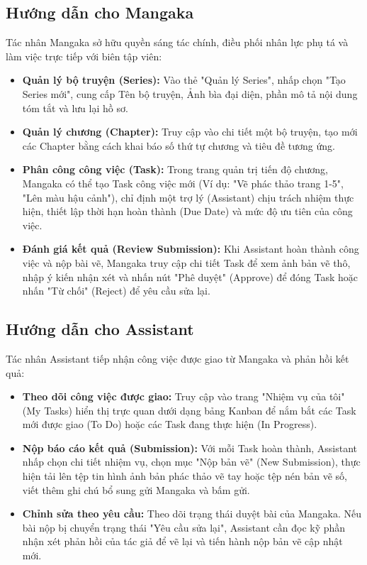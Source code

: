 \subsection{Hướng dẫn cho Mangaka}
\label{subsec:manual_mangaka}
Tác nhân Mangaka sở hữu quyền sáng tác chính, điều phối nhân lực phụ tá và làm việc trực tiếp với biên tập viên:
\begin{itemize}
    \item \textbf{Quản lý bộ truyện (Series):} Vào thẻ "Quản lý Series", nhấp chọn "Tạo Series mới", cung cấp Tên bộ truyện, Ảnh bìa đại diện, phần mô tả nội dung tóm tắt và lưu lại hồ sơ.
    \item \textbf{Quản lý chương (Chapter):} Truy cập vào chi tiết một bộ truyện, tạo mới các Chapter bằng cách khai báo số thứ tự chương và tiêu đề tương ứng.
    \item \textbf{Phân công công việc (Task):} Trong trang quản trị tiến độ chương, Mangaka có thể tạo Task công việc mới (Ví dụ: "Vẽ phác thảo trang 1-5", "Lên màu hậu cảnh"), chỉ định một trợ lý (Assistant) chịu trách nhiệm thực hiện, thiết lập thời hạn hoàn thành (Due Date) và mức độ ưu tiên của công việc.
    \item \textbf{Đánh giá kết quả (Review Submission):} Khi Assistant hoàn thành công việc và nộp bài vẽ, Mangaka truy cập chi tiết Task để xem ảnh bản vẽ thô, nhập ý kiến nhận xét và nhấn nút "Phê duyệt" (Approve) để đóng Task hoặc nhấn "Từ chối" (Reject) để yêu cầu sửa lại.
\end{itemize}

\subsection{Hướng dẫn cho Assistant}
\label{subsec:manual_assistant}
Tác nhân Assistant tiếp nhận công việc được giao từ Mangaka và phản hồi kết quả:
\begin{itemize}
    \item \textbf{Theo dõi công việc được giao:} Truy cập vào trang "Nhiệm vụ của tôi" (My Tasks) hiển thị trực quan dưới dạng bảng Kanban để nắm bắt các Task mới được giao (To Do) hoặc các Task đang thực hiện (In Progress).
    \item \textbf{Nộp báo cáo kết quả (Submission):} Với mỗi Task hoàn thành, Assistant nhấp chọn chi tiết nhiệm vụ, chọn mục "Nộp bản vẽ" (New Submission), thực hiện tải lên tệp tin hình ảnh bản phác thảo vẽ tay hoặc tệp nén bản vẽ số, viết thêm ghi chú bổ sung gửi Mangaka và bấm gửi.
    \item \textbf{Chỉnh sửa theo yêu cầu:} Theo dõi trạng thái duyệt bài của Mangaka. Nếu bài nộp bị chuyển trạng thái "Yêu cầu sửa lại", Assistant cần đọc kỹ phần nhận xét phản hồi của tác giả để vẽ lại và tiến hành nộp bản vẽ cập nhật mới.
\end{itemize}

